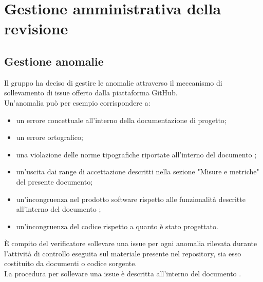 
\section{Gestione amministrativa della revisione}
	\subsection{Gestione anomalie}
		Il gruppo ha deciso di gestire le anomalie attraverso il meccanismo di sollevamento di issue offerto dalla piattaforma GitHub.\\
		Un'anomalia può per esempio corrispondere a:
		\begin{itemize}
			\item un errore concettuale all'interno della documentazione di progetto;
			\item un errore ortografico;
			\item una violazione delle norme tipografiche riportate all'interno del documento ;
			\item un'uscita dai range di accettazione descritti nella sezione "Misure e metriche" del presente documento;
			\item un'incongruenza nel prodotto software rispetto alle funzionalità descritte all'interno del documento ;
			\item un'incongruenza del codice rispetto a quanto è stato progettato.
		\end{itemize}
		È compito del verificatore sollevare una issue per ogni anomalia rilevata durante l'attività di controllo eseguita sul materiale presente 
		nel repository, sia esso costituito da documenti o codice sorgente.\\
		La procedura per sollevare una issue è descritta all'interno del documento .